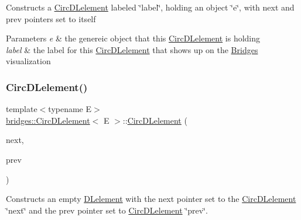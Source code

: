 Constructs a \mbox{\hyperlink{classbridges_1_1_circ_d_lelement}{Circ\+D\+Lelement}} labeled \char`\"{}label\char`\"{}, holding an object \char`\"{}e\char`\"{}, with next and prev pointers set to itself 
\begin{DoxyParams}{Parameters}
{\em e} & the genereic object that this \mbox{\hyperlink{classbridges_1_1_circ_d_lelement}{Circ\+D\+Lelement}} is holding \\
\hline
{\em label} & the label for this \mbox{\hyperlink{classbridges_1_1_circ_d_lelement}{Circ\+D\+Lelement}} that shows up on the \mbox{\hyperlink{namespacebridges_1_1_bridges}{Bridges}} visualization \\
\hline
\end{DoxyParams}
\mbox{\label{classbridges_1_1_circ_d_lelement_a9d0cf8a5b60e3fedc1ba1ad792570934}} 
\subsubsection{\texorpdfstring{Circ\+D\+Lelement()}{CircDLelement()}\hspace{0.1cm}{\footnotesize\ttfamily [3/4]}}
{\footnotesize\ttfamily template$<$typename E$>$ \\
\mbox{\hyperlink{classbridges_1_1_circ_d_lelement}{bridges\+::\+Circ\+D\+Lelement}}$<$ E $>$\+::\mbox{\hyperlink{classbridges_1_1_circ_d_lelement}{Circ\+D\+Lelement}} (\begin{DoxyParamCaption}\item[{\mbox{\hyperlink{classbridges_1_1_circ_d_lelement}{Circ\+D\+Lelement}}$<$ E $>$}]{next,  }\item[{\mbox{\hyperlink{classbridges_1_1_circ_d_lelement}{Circ\+D\+Lelement}}$<$ E $>$}]{prev }\end{DoxyParamCaption})\hspace{0.3cm}{\ttfamily [inline]}}

Constructs an empty \mbox{\hyperlink{classbridges_1_1_d_lelement}{D\+Lelement}} with the next pointer set to the \mbox{\hyperlink{classbridges_1_1_circ_d_lelement}{Circ\+D\+Lelement}} \char`\"{}next\char`\"{} and the prev pointer set to \mbox{\hyperlink{classbridges_1_1_circ_d_lelement}{Circ\+D\+Lelement}} \char`\"{}prev\char`\"{}.


